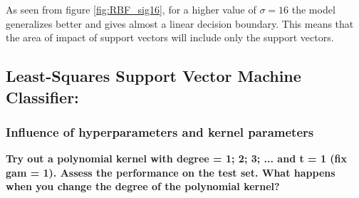 {As seen from figure \ref{fig:RBF_sig16}, for a higher value of $\sigma = 16$ the model generalizes better and gives almost a linear decision boundary. This means that the area of impact of support vectors will include only the support vectors.

\subsection{Least-Squares Support Vector Machine Classifier:}
\subsubsection{Influence of hyperparameters and kernel parameters }
\textbf{Try out a polynomial kernel with degree = 1; 2; 3; ... and t = 1 (fix gam = 1). Assess	the performance on the test set. What happens when you change the degree of the polynomial kernel?}

}
